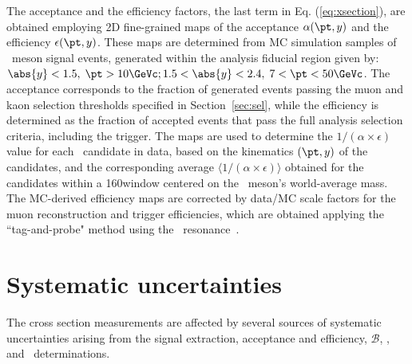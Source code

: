 The acceptance and the efficiency factors, the last term in Eq. (\ref{eq:xsection}), are obtained employing 2D fine-grained maps of the acceptance $\alpha (\pt,y)$ and the efficiency $\epsilon(\pt,y)$.
These maps are determined from MC simulation samples of \PB\ meson signal events, generated within the analysis fiducial region given by: $\abs{y}<1.5, \; \pt>10\GeVc; 1.5<\abs{y}<2.4, \; 7<\pt<50\GeVc$.
%
The acceptance corresponds to the fraction of generated events passing the muon and kaon selection thresholds specified in Section~\ref{sec:sel}, while the efficiency is determined as the fraction of accepted events that pass the full analysis selection criteria, including the trigger.
%
The maps are used to determine the $1/(\alpha\times\epsilon)$ value for each \PB\ candidate in data, based on the kinematics $(\pt,y)$ of the candidates, and the corresponding average $\langle 1/(\alpha\times \epsilon)\rangle$ obtained for the candidates within a 160\MeVcc window centered on the \PB\ meson's world-average mass. 
The MC-derived efficiency maps are corrected by data/MC scale factors for the muon reconstruction and trigger efficiencies, which are obtained applying the ``tag-and-probe" method using the \PJGy\ resonance~\cite{Khachatryan:2010zg}.
%


\section{Systematic uncertainties}

The cross section measurements are affected by several sources of systematic uncertainties arising from the signal extraction, acceptance and efficiency, $\mathcal{B}$, \NMB, and \TAA\ determinations.


